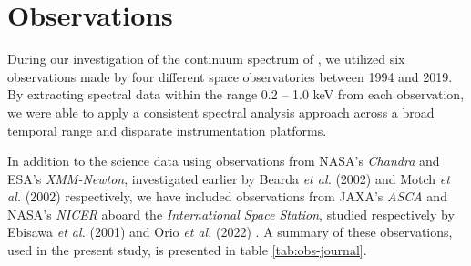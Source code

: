 \section{Observations}
	During our investigation of the continuum spectrum of \source, we utilized six observations made by four different space observatories between 1994 and 2019.
	By extracting spectral data within the range 0.2 -- 1.0 keV from each observation, we were able to apply a consistent spectral analysis approach across a broad temporal range and disparate instrumentation platforms.
		
	In addition to the science data using observations from NASA's \textit{Chandra} and ESA's \textit{XMM-Newton}, investigated earlier by Bearda \textit{et al.} (2002) \cite{beardaChandra2002AA} and Motch \textit{et al.} (2002) \cite{motchXmmNewton2002AA} respectively, we have included observations from JAXA's \textit{ASCA} and NASA's \textit{NICER} aboard the \textit{International Space Station}, studied respectively by Ebisawa \textit{et al.} (2001) \cite{ebisawaAsca2001ApJ} and Orio \textit{et al.} (2022) \cite{orioNicer2022ApJ}. A summary of these observations, used in the present study, %
	is presented in table \ref{tab:obs-journal}. %
